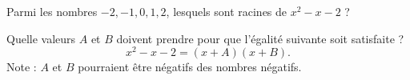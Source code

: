 
\begin{exercice}\label{exoPremiere-0031}

    Parmi les nombres \( -2,-1,0,1,2\), lesquels sont racines de \( x^2-x-2\) ?

    Quelle valeurs \( A\) et \( B\) doivent prendre pour que l'égalité suivante soit satisfaite ?
    \begin{equation}
        x^2-x-2=(x+A)(x+B).
    \end{equation}
    Note : \( A\) et \( B\) pourraient être négatifs des nombres négatifs.


\end{exercice}
